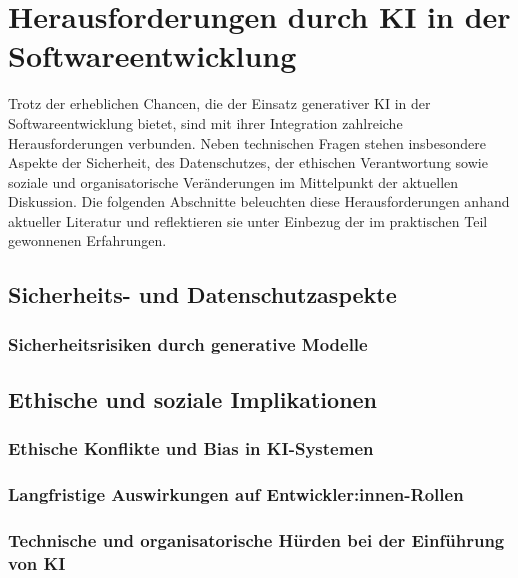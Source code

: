 \chapter{Herausforderungen durch KI in der Softwareentwicklung}
Trotz der erheblichen Chancen, die der Einsatz generativer KI in der
Softwareentwicklung bietet, sind mit ihrer Integration zahlreiche
Herausforderungen verbunden. Neben technischen Fragen stehen insbesondere
Aspekte der Sicherheit, des Datenschutzes, der ethischen Verantwortung sowie
soziale und organisatorische Veränderungen im Mittelpunkt der aktuellen
Diskussion. Die folgenden Abschnitte beleuchten diese Herausforderungen anhand
aktueller Literatur und reflektieren sie unter Einbezug der im praktischen Teil
gewonnenen Erfahrungen.

\section{Sicherheits- und Datenschutzaspekte}


\subsection{Sicherheitsrisiken durch generative Modelle}


\section{Ethische und soziale Implikationen}


\subsection{Ethische Konflikte und Bias in KI-Systemen}


\subsection{Langfristige Auswirkungen auf Entwickler:innen-Rollen}


\subsection{Technische und organisatorische Hürden bei der Einführung von KI}


